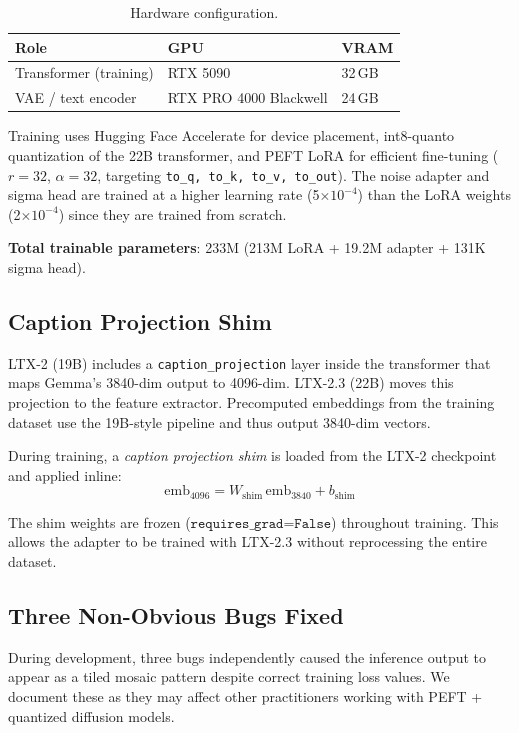 \documentclass[10pt,twocolumn]{article}
\begin{document}
\begin{table}[h]
\centering
\caption{Hardware configuration.}
\label{tab:hardware}
\begin{tabular}{@{}lll@{}}
\toprule
Role & GPU & VRAM \\
\midrule
Transformer (training) & RTX 5090 & 32\,GB \\
VAE / text encoder & RTX PRO 4000 Blackwell & 24\,GB \\
\bottomrule
\end{tabular}
\end{table}

Training uses Hugging Face Accelerate for device placement, int8-quanto quantization of the 22B transformer, and PEFT LoRA for efficient fine-tuning ($r=32$, $\alpha=32$, targeting \texttt{to\_q,\,to\_k,\,to\_v,\,to\_out}). The noise adapter and sigma head are trained at a higher learning rate (5$\times10^{-4}$) than the LoRA weights (2$\times10^{-4}$) since they are trained from scratch.

\textbf{Total trainable parameters}: 233M (213M LoRA + 19.2M adapter + 131K sigma head).

\subsection{Caption Projection Shim}

LTX-2 (19B) includes a \texttt{caption\_projection} layer inside the transformer that maps Gemma's 3840-dim output to 4096-dim. LTX-2.3 (22B) moves this projection to the feature extractor. Precomputed embeddings from the training dataset use the 19B-style pipeline and thus output 3840-dim vectors.

During training, a \emph{caption projection shim} is loaded from the LTX-2 checkpoint and applied inline:
\begin{equation}
  \text{emb}_{4096} = W_{\text{shim}}\,\text{emb}_{3840} + b_{\text{shim}}
\end{equation}

The shim weights are frozen ($\texttt{requires\_grad=False}$) throughout training. This allows the adapter to be trained with LTX-2.3 without reprocessing the entire dataset.

\subsection{Three Non-Obvious Bugs Fixed}

During development, three bugs independently caused the inference output to appear as a tiled mosaic pattern despite correct training loss values. We document these as they may affect other practitioners working with PEFT + quantized diffusion models.
\end{document}
